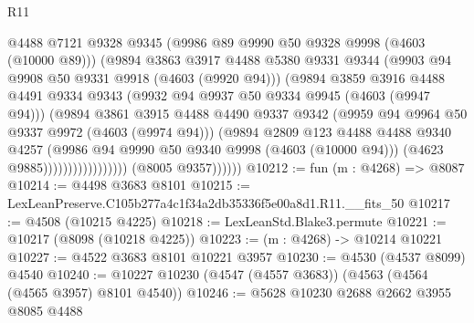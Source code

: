 \begin{lexlean}{R11}
\begin{coremodule}
                                      @4488
                                      @7121
                                      @9328
                                      @9345
                                      (@9986 @89 @9990 @50 @9328 @9998 (@4603 (@10000 @89)))
                                      (@9894
                                        @3863
                                        @3917
                                        @4488
                                        @5380
                                        @9331
                                        @9344
                                        (@9903 @94 @9908 @50 @9331 @9918 (@4603 (@9920 @94)))
                                        (@9894
                                          @3859
                                          @3916
                                          @4488
                                          @4491
                                          @9334
                                          @9343
                                          (@9932 @94 @9937 @50 @9334 @9945 (@4603 (@9947 @94)))
                                          (@9894
                                            @3861
                                            @3915
                                            @4488
                                            @4490
                                            @9337
                                            @9342
                                            (@9959 @94 @9964 @50 @9337 @9972 (@4603 (@9974 @94)))
                                            (@9894
                                              @2809
                                              @123
                                              @4488
                                              @4488
                                              @9340
                                              @4257
                                              (@9986 @94 @9990 @50 @9340 @9998 (@4603 (@10000 @94)))
                                              (@4623 @9885)))))))))))))))))
              (@8005 @9357))))))
@10212 := fun (m : @4268) => @8087
@10214 := @4498 @3683 @8101
@10215 := LexLeanPreserve.C105b277a4c1f34a2db35336f5e00a8d1.R11.__fits_50
@10217 := @4508 (@10215 @4225)
@10218 := LexLeanStd.Blake3.permute
@10221 := @10217 (@8098 (@10218 @4225))
@10223 := (m : @4268) -> @10214 @10221
@10227 := @4522 @3683 @8101 @10221 @3957
@10230 := @4530 (@4537 @8099) @4540
@10240 := @10227 @10230 (@4547 (@4557 @3683)) (@4563 (@4564 (@4565 @3957) @8101 @4540))
@10246 := @5628 @10230 @2688 @2662 @3955 @8085 @4488

\end{coremodule}
\end{lexlean}
